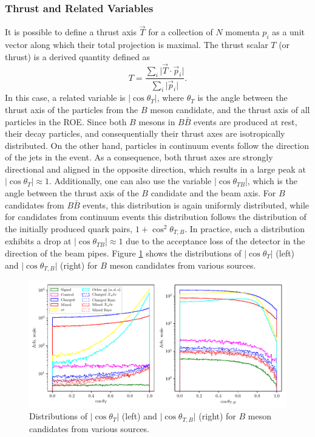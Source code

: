 \subsubsection{Thrust and Related Variables}
It is possible to define a thrust axis $\vec{T}$ for a collection of $N$ momenta $p_i$ as a unit vector along which their total projection is maximal. The thrust scalar $T$ (or thrust) is a derived quantity defined as
\begin{equation}
T = \frac{\sum_{i}\vert \vec{T} \cdot \vec{p}_i\vert}{\sum_{i}\vert \vec{p}_i\vert}.
\end{equation}
In this case, a related variable is $\vert \cos\theta_T\vert$, where $\theta_T$ is the angle between the thrust axis of the particles from the $B$ meson candidate, and the thrust axis of all particles in the ROE. Since both $B$ mesons in $B \bar B$ events are produced at rest, their decay particles, and consequentially their thrust axes are isotropically distributed. On the other hand, particles in continuum events follow the direction of the jets in the event. As a consequence, both thrust axes are strongly directional and aligned in the opposite direction, which results in a large peak at $\vert \cos\theta_T\vert \approx 1$. Additionally, one can also use the variable $\vert \cos\theta_{TB}\vert $, which is the angle between the thrust axis of the $B$ candidate and the beam axis. For $B$ candidates from $B \bar B$ events, this distribution is again uniformly distributed, while for candidates from continuum events this distribution follows the distribution of the initially produced quark pairs, $1+\cos^2\theta_{T,B}$. In practice, such a distribution exhibits a drop at $\vert \cos\theta_{TB}\vert \approx 1$ due to the acceptance loss of the detector in the direction of the beam pipes. Figure \ref{fig:cosplots} shows the distributions of $\vert \cos\theta_T\vert$ (left) and $\vert \cos\theta_{T,B}\vert$ (right) for $B$ meson candidates from various sources.

\begin{figure}[H]
	\centering
	\captionsetup{width=0.8\linewidth}
	\includegraphics[width=\linewidth]{fig/cs_cosplots}
	\caption{Distributions of $\vert \cos\theta_T\vert$ (left) and $\vert \cos\theta_{T,B}\vert$ (right) for $B$ meson candidates from various sources.}
	\label{fig:cosplots}
\end{figure}

